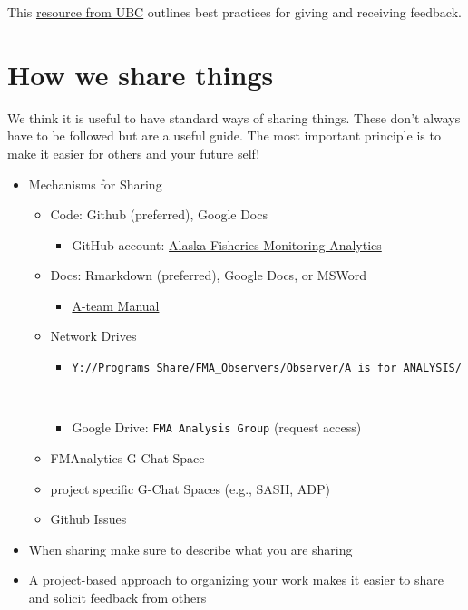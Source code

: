 \documentclass[
  letterpaper,
  DIV=11,
  numbers=noendperiod]{scrreprt}
\providecommand{\tightlist}{%
  \setlength{\itemsep}{0pt}\setlength{\parskip}{0pt}}\usepackage{longtable,booktabs,array}
\begin{document}
This
\href{https://scwrl.ubc.ca/stem-writing-resources/learning-strategies-for-communicating-science/how-to-give-and-receive-effective-feedback/}{resource
from UBC} outlines best practices for giving and receiving feedback.

\hypertarget{how-we-share-things}{%
\section{How we share things}\label{how-we-share-things}}

We think it is useful to have standard ways of sharing things. These
don't always have to be followed but are a useful guide. The most
important principle is to make it easier for others and your future
self!

\begin{itemize}
\tightlist
\item
  Mechanisms for Sharing

  \begin{itemize}
  \tightlist
  \item
    Code: Github (preferred), Google Docs

    \begin{itemize}
    \tightlist
    \item
      GitHub account:
      \href{https://github.com/Alaska-Fisheries-Monitoring-Analytics}{Alaska
      Fisheries Monitoring Analytics}\\
    \end{itemize}
  \item
    Docs: Rmarkdown (preferred), Google Docs, or MSWord

    \begin{itemize}
    \tightlist
    \item
      \href{https://github.com/Alaska-Fisheries-Monitoring-Analytics/ateam-manual}{A-team
      Manual}\\
    \end{itemize}
  \item
    Network Drives

    \begin{itemize}
    \tightlist
    \item
      \texttt{Y://Programs\ Share/FMA\_Observers/Observer/A\ is\ for\ ANALYSIS/}\strut \\
    \item
      Google Drive: \texttt{FMA\ Analysis\ Group} (request access)
    \end{itemize}
  \item
    FMAnalytics G-Chat Space\\
  \item
    project specific G-Chat Spaces (e.g., SASH, ADP)\\
  \item
    Github Issues\\
  \end{itemize}
\item
  When sharing make sure to describe what you are sharing\\
\item
  A project-based approach to organizing your work makes it easier to
  share and solicit feedback from others


\end{itemize}
\end{document}
